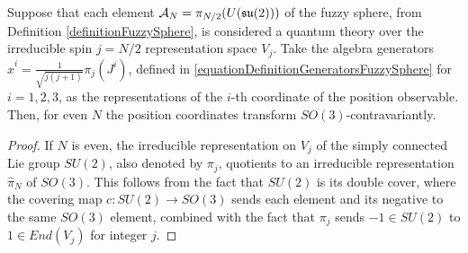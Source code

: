 \begin{proposition}\label{propositionMadoreISSO3Covariant}
Suppose that each element $\mathcal A_N = \pi_{N/2}(U(\mathfrak{su}(2)))$ of the fuzzy sphere, from Definition \ref{definitionFuzzySphere}, is considered a quantum theory over the irreducible spin $j = N/2$ representation space $V_{j}$. Take the algebra generators $\hat x^i = \frac{1}{\sqrt{j(j+1)}}\pi_j(J^i)$, defined in \eqref{equationDefinitionGeneratorsFuzzySphere} for $i = 1, 2, 3$, as the representations of the $i$-th coordinate of the position observable. Then, for even $N$ the position coordinates transform $SO(3)$-contravariantly.
\end{proposition}
\begin{proof}
If $N$ is even, the irreducible representation on $V_j$ of the simply connected Lie group $SU(2)$, also denoted by $\pi_j$, quotients to an irreducible representation $\hat \pi_N$ of $SO(3)$. This follows from the fact that $SU(2)$ is its double cover, where the covering map $c:SU(2) \to SO(3)$ sends each element and its negative to the same $SO(3)$ element, combined with the fact that $\pi_j$ sends $-1 \in SU(2)$ to $1 \in End(V_j)$ for integer $j$.


\end{proof}
